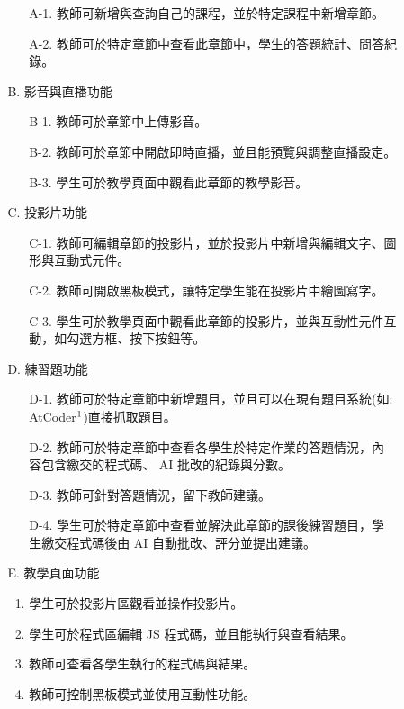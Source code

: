 \documentclass[12pt]{article}
\begin{document}
\begin{enumerate}
\begin{enumerate}
\begin{enumerate}[itemindent=24pt]
            \begin{enumerate}[itemindent=24pt]
              \item [A-1.] 教師可新增與查詢自己的課程，並於特定課程中新增章節。
              \item [A-2.] 教師可於特定章節中查看此章節中，學生的答題統計、問答紀錄。
            \end{enumerate}
          \item [B.] 影音與直播功能
            \begin{enumerate}[itemindent=24pt]
              \item [B-1.] 教師可於章節中上傳影音。
              \item [B-2.] 教師可於章節中開啟即時直播，並且能預覽與調整直播設定。
              \item [B-3.] 學生可於教學頁面中觀看此章節的教學影音。
            \end{enumerate}
          \item [C.] 投影片功能
            \begin{enumerate}[itemindent=24pt]
              \item [C-1.] 教師可編輯章節的投影片，並於投影片中新增與編輯文字、圖形與互動式元件。
              \item [C-2.] 教師可開啟黑板模式，讓特定學生能在投影片中繪圖寫字。
              \item [C-3.] 學生可於教學頁面中觀看此章節的投影片，並與互動性元件互動，如勾選方框、按下按鈕等。
            \end{enumerate}
          \item [D.] 練習題功能
            \begin{enumerate}[itemindent=24pt]
              \item [D-1.] 教師可於特定章節中新增題目，並且可以在現有題目系統(如: AtCoder$\footnote{https://atcoder.jp/}$)直接抓取題目。
              \item [D-2.] 教師可於特定章節中查看各學生於特定作業的答題情況，內容包含繳交的程式碼、 AI 批改的紀錄與分數。
              \item [D-3.] 教師可針對答題情況，留下教師建議。
              \item [D-4.] 學生可於特定章節中查看並解決此章節的課後練習題目，學生繳交程式碼後由 AI 自動批改、評分並提出建議。
            \end{enumerate}
          \item [E.] 教學頁面功能
            \begin{enumerate}[itemindent=24pt, label=E-\arabic*.]
              \item 學生可於投影片區觀看並操作投影片。
              \item 學生可於程式區編輯 JS 程式碼，並且能執行與查看結果。
              \item 教師可查看各學生執行的程式碼與結果。
              \item 教師可控制黑板模式並使用互動性功能。
            \end{enumerate}
          \end{enumerate}


\end{enumerate}
\end{enumerate}
\end{document}
